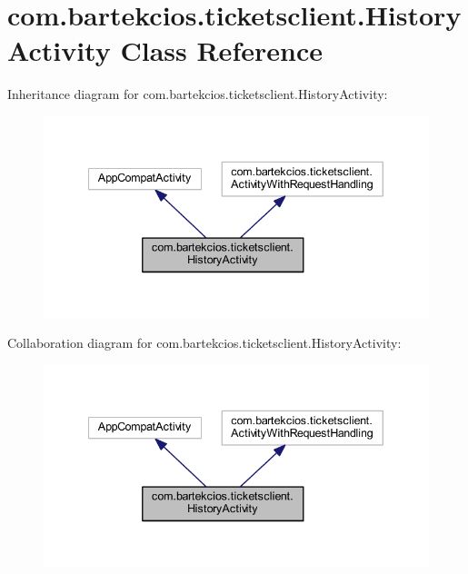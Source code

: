 \hypertarget{classcom_1_1bartekcios_1_1ticketsclient_1_1_history_activity}{}\section{com.\+bartekcios.\+ticketsclient.\+History\+Activity Class Reference}
\label{classcom_1_1bartekcios_1_1ticketsclient_1_1_history_activity}


Inheritance diagram for com.\+bartekcios.\+ticketsclient.\+History\+Activity\+:
\nopagebreak
\begin{figure}[H]
\begin{center}
\leavevmode
\includegraphics[width=340pt]{classcom_1_1bartekcios_1_1ticketsclient_1_1_history_activity__inherit__graph}
\end{center}
\end{figure}


Collaboration diagram for com.\+bartekcios.\+ticketsclient.\+History\+Activity\+:
\nopagebreak
\begin{figure}[H]
\begin{center}
\leavevmode
\includegraphics[width=340pt]{classcom_1_1bartekcios_1_1ticketsclient_1_1_history_activity__coll__graph}
\end{center}
\end{figure}
